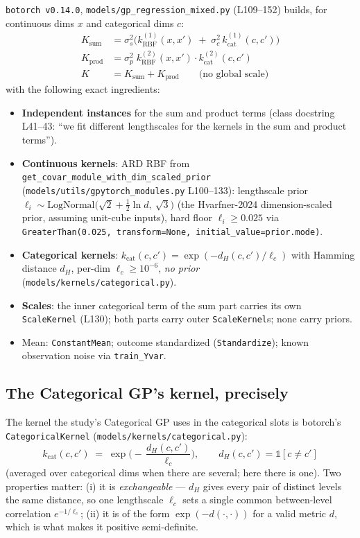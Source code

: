 \documentclass[11pt]{article}
\begin{document}
\texttt{botorch v0.14.0}, \texttt{models/gp\_regression\_mixed.py} (L109--152) builds, for
continuous dims $x$ and categorical dims $c$:
\begin{align}
K_{\mathrm{sum}} &= \sigma_s^2\Big(k_{\mathrm{RBF}}^{(1)}(x,x') \;+\;
      \sigma_c^2\, k_{\mathrm{cat}}^{(1)}(c,c')\Big) \tag{L124--138}\\
K_{\mathrm{prod}} &= \sigma_p^2\; k_{\mathrm{RBF}}^{(2)}(x,x')\cdot
      k_{\mathrm{cat}}^{(2)}(c,c') \tag{L139--151}\\
K &= K_{\mathrm{sum}} + K_{\mathrm{prod}} \qquad\text{(no global scale)} \tag{L152}
\end{align}
with the following exact ingredients:
\begin{itemize}
\item \textbf{Independent instances} for the sum and product terms (class docstring L41--43:
``we fit different lengthscales for the kernels in the sum and product terms'').
\item \textbf{Continuous kernels}: ARD RBF from
\texttt{get\_covar\_module\_with\_dim\_scaled\_prior}\\
(\texttt{models/utils/gpytorch\_modules.py} L100--133): lengthscale prior
$\ell_i \sim \mathrm{LogNormal}\!\big(\sqrt2 + \tfrac12\ln d,\ \sqrt3\big)$
(the Hvarfner-2024 dimension-scaled prior, assuming unit-cube inputs), hard floor
$\ell_i \ge 0.025$ via \texttt{GreaterThan(0.025, transform=None,
initial\_value=prior.mode)}.
\item \textbf{Categorical kernels}: $k_{\mathrm{cat}}(c,c') = \exp(-d_H(c,c')/\ell_c)$ with
Hamming distance $d_H$, per-dim $\ell_c \ge 10^{-6}$, \emph{no prior}
(\texttt{models/kernels/categorical.py}).
\item \textbf{Scales}: the inner categorical term of the sum part carries its own
\texttt{ScaleKernel} (L130); both parts carry outer \texttt{ScaleKernel}s; none carry priors.
\item Mean: \texttt{ConstantMean}; outcome standardized (\texttt{Standardize}); known
observation noise via \texttt{train\_Yvar}.
\end{itemize}

\subsection*{The Categorical GP's kernel, precisely}
The kernel the study's Categorical GP uses in the categorical slots is botorch's
\texttt{CategoricalKernel} (\texttt{models/kernels/categorical.py}):
\begin{equation}
k_{\mathrm{cat}}(c, c') \;=\; \exp\!\Big(-\,\frac{d_H(c,c')}{\ell_c}\Big),
\qquad d_H(c,c') = \mathbb 1[c \neq c']
\label{eq:hamming}
\end{equation}
(averaged over categorical dims when there are several; here there is one). Two properties
matter: (i) it is \emph{exchangeable} --- $d_H$ gives every pair of distinct levels the same
distance, so one lengthscale $\ell_c$ sets a single common between-level correlation
$e^{-1/\ell_c}$; (ii) it is of the form $\exp(-d(\cdot,\cdot))$ for a valid metric $d$, which
is what makes it positive semi-definite.
\end{document}
